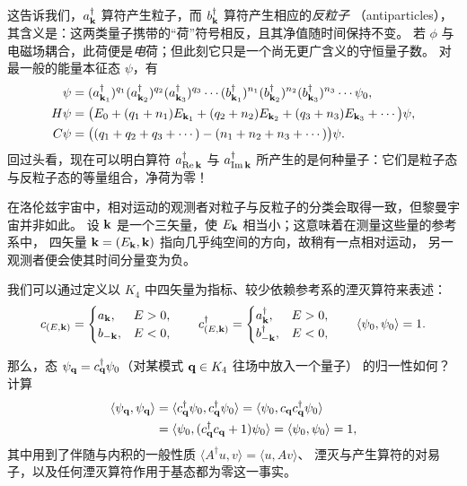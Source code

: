 这告诉我们，$a^{\dagger}_{\mathbf{k}}$ 算符产生粒子，而 $b^{\dagger}_{\mathbf{k}}$ 算符产生相应的\emph{反粒子}
（antiparticles），其含义是：这两类量子携带的“荷”符号相反，且其净值随时间保持不变。
若 $\phi$ 与电磁场耦合，此荷便是\emph{电}荷；但此刻它只是一个尚无更广含义的守恒量子数。
对最一般的能量本征态 $\psi$，有
\begin{align*}
\psi&=(a^{\dagger}_{\mathbf{k}_{1}})^{q_{1}}(a^{\dagger}_{\mathbf{k}_{2}})^{q_{2}}(a^{\dagger}_{\mathbf{k}_{3}})^{q_{3}}\cdots
(b^{\dagger}_{\mathbf{k}_{1}})^{n_{1}}(b^{\dagger}_{\mathbf{k}_{2}})^{n_{2}}(b^{\dagger}_{\mathbf{k}_{3}})^{n_{3}}\cdots\psi_{0},\\
H\psi&=\bigl(E_{0}+(q_{1}+n_{1})E_{\mathbf{k}_{1}}+(q_{2}+n_{2})E_{\mathbf{k}_{2}}
+(q_{3}+n_{3})E_{\mathbf{k}_{3}}+\cdots\bigr)\psi,\\
C\psi&=\bigl((q_{1}+q_{2}+q_{3}+\cdots)-(n_{1}+n_{2}+n_{3}+\cdots)\bigr)\psi .
\end{align*}
回过头看，现在可以明白算符 $a^{\dagger}_{\operatorname{Re}\mathbf{k}}$ 与 $a^{\dagger}_{\operatorname{Im}\mathbf{k}}$
所产生的是何种量子：它们是粒子态与反粒子态的等量组合，净荷为零！

在洛伦兹宇宙中，相对运动的观测者对粒子与反粒子的分类会取得一致，但黎曼宇宙并非如此。
设 $\mathbf{k}$ 是一个三矢量，使 $E_{\mathbf{k}}$ 相当小；这意味着在测量这些量的参考系中，
四矢量 $\mathbf{k}=(E_{\mathbf{k}},\mathbf{k})$ 指向几乎纯空间的方向，故稍有一点相对运动，
另一观测者便会使其时间分量变为负。

我们可以通过定义以 $K_{4}$ 中四矢量为指标、较少依赖参考系的湮灭算符来表述：
\begin{equation*}
c_{(E,\mathbf{k})}=
\begin{cases}
a_{\mathbf{k}}, & E>0,\\
b_{-\mathbf{k}}, & E<0,
\end{cases}
\qquad
c^{\dagger}_{(E,\mathbf{k})}=
\begin{cases}
a^{\dagger}_{\mathbf{k}}, & E>0,\\
b^{\dagger}_{-\mathbf{k}}, & E<0,
\end{cases}
\qquad
\langle\psi_{0},\psi_{0}\rangle=1 .
\end{equation*}

那么，态 $\psi_{\mathbf{q}}=c^{\dagger}_{\mathbf{q}}\psi_{0}$（对某模式 $\mathbf{q}\in K_{4}$ 往场中放入一个量子）
的归一性如何？计算
\begin{align*}
\langle\psi_{\mathbf{q}},\psi_{\mathbf{q}}\rangle
&=\langle c^{\dagger}_{\mathbf{q}}\psi_{0},c^{\dagger}_{\mathbf{q}}\psi_{0}\rangle
=\langle\psi_{0},c_{\mathbf{q}}c^{\dagger}_{\mathbf{q}}\psi_{0}\rangle\\
&=\langle\psi_{0},(c^{\dagger}_{\mathbf{q}}c_{\mathbf{q}}+1)\psi_{0}\rangle
=\langle\psi_{0},\psi_{0}\rangle=1,
\end{align*}
其中用到了伴随与内积的一般性质 $\langle A^{\dagger}u,v\rangle=\langle u,Av\rangle$、
湮灭与产生算符的对易子，以及任何湮灭算符作用于基态都为零这一事实。

